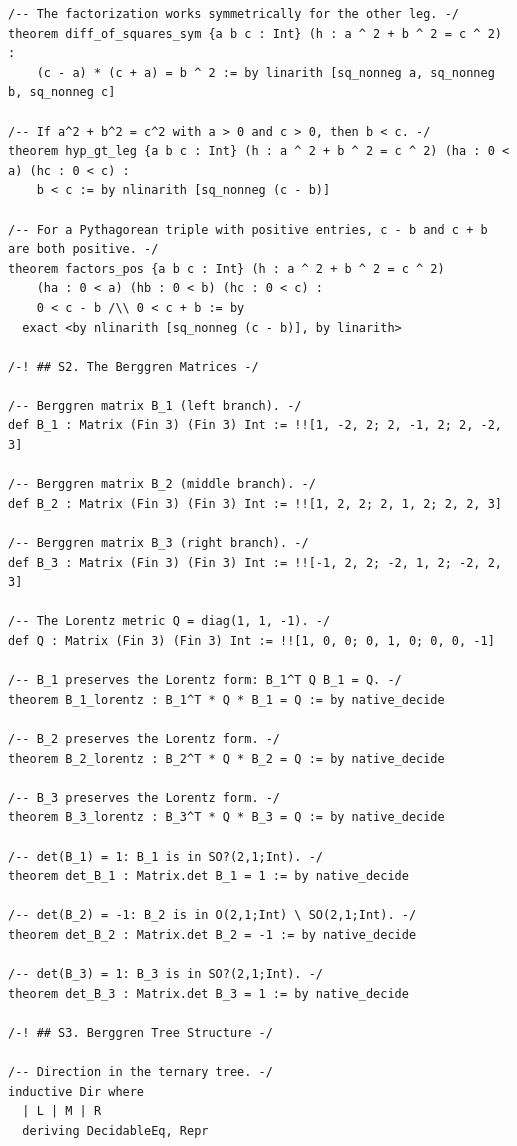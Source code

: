 \documentclass[11pt,openright,twoside]{book}
\theoremstyle{definition}
\begin{document}
\begin{lstlisting}[style=lean]
/-- The factorization works symmetrically for the other leg. -/
theorem diff_of_squares_sym {a b c : Int} (h : a ^ 2 + b ^ 2 = c ^ 2) :
    (c - a) * (c + a) = b ^ 2 := by linarith [sq_nonneg a, sq_nonneg b, sq_nonneg c]

/-- If a^2 + b^2 = c^2 with a > 0 and c > 0, then b < c. -/
theorem hyp_gt_leg {a b c : Int} (h : a ^ 2 + b ^ 2 = c ^ 2) (ha : 0 < a) (hc : 0 < c) :
    b < c := by nlinarith [sq_nonneg (c - b)]

/-- For a Pythagorean triple with positive entries, c - b and c + b are both positive. -/
theorem factors_pos {a b c : Int} (h : a ^ 2 + b ^ 2 = c ^ 2)
    (ha : 0 < a) (hb : 0 < b) (hc : 0 < c) :
    0 < c - b /\\ 0 < c + b := by
  exact <by nlinarith [sq_nonneg (c - b)], by linarith>

/-! ## S2. The Berggren Matrices -/

/-- Berggren matrix B_1 (left branch). -/
def B_1 : Matrix (Fin 3) (Fin 3) Int := !![1, -2, 2; 2, -1, 2; 2, -2, 3]

/-- Berggren matrix B_2 (middle branch). -/
def B_2 : Matrix (Fin 3) (Fin 3) Int := !![1, 2, 2; 2, 1, 2; 2, 2, 3]

/-- Berggren matrix B_3 (right branch). -/
def B_3 : Matrix (Fin 3) (Fin 3) Int := !![-1, 2, 2; -2, 1, 2; -2, 2, 3]

/-- The Lorentz metric Q = diag(1, 1, -1). -/
def Q : Matrix (Fin 3) (Fin 3) Int := !![1, 0, 0; 0, 1, 0; 0, 0, -1]

/-- B_1 preserves the Lorentz form: B_1^T Q B_1 = Q. -/
theorem B_1_lorentz : B_1^T * Q * B_1 = Q := by native_decide

/-- B_2 preserves the Lorentz form. -/
theorem B_2_lorentz : B_2^T * Q * B_2 = Q := by native_decide

/-- B_3 preserves the Lorentz form. -/
theorem B_3_lorentz : B_3^T * Q * B_3 = Q := by native_decide

/-- det(B_1) = 1: B_1 is in SO?(2,1;Int). -/
theorem det_B_1 : Matrix.det B_1 = 1 := by native_decide

/-- det(B_2) = -1: B_2 is in O(2,1;Int) \ SO(2,1;Int). -/
theorem det_B_2 : Matrix.det B_2 = -1 := by native_decide

/-- det(B_3) = 1: B_3 is in SO?(2,1;Int). -/
theorem det_B_3 : Matrix.det B_3 = 1 := by native_decide

/-! ## S3. Berggren Tree Structure -/

/-- Direction in the ternary tree. -/
inductive Dir where
  | L | M | R
  deriving DecidableEq, Repr


\end{lstlisting}
\end{document}
